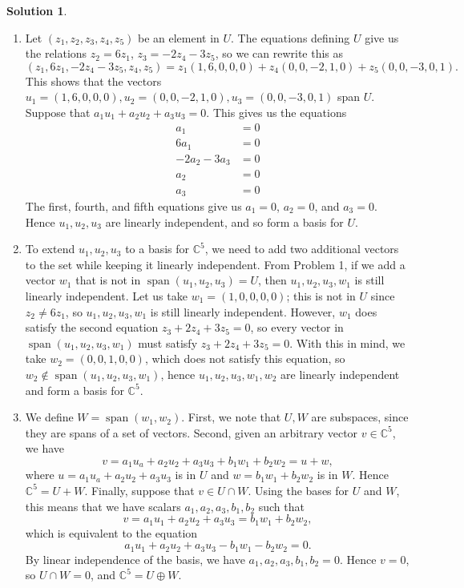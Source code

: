 \documentclass[12pt]{article}
\theoremstyle{definition}
\theoremstyle{definition}
\newtheorem*{soln}{Solution}
\newcommand{\C}{\mathbb{C}}
\newcommand{\Span}{\operatorname{span}}
\begin{document}
\begin{soln}
\begin{enumerate}[label=(\alph*)]
\item Let $(z_1,z_2,z_3,z_4,z_5)$ be an element in $U$. The equations defining $U$ give us the relations $z_2=6z_1$, $z_3=-2z_4-3z_5$, so we can rewrite this as
\[(z_1,6z_1,-2z_4-3z_5,z_4,z_5)=z_1(1,6,0,0,0)+z_4(0,0,-2,1,0)+z_5(0,0,-3,0,1).\]
This shows that the vectors $u_1=(1,6,0,0,0),u_2=(0,0,-2,1,0),u_3=(0,0,-3,0,1)$ span $U$. Suppose that $a_1u_1+a_2u_2+a_3u_3=0$. This gives us the equations
\begin{align*}
a_1 &=0 \\
6a_1 &= 0 \\
-2a_2-3a_3 &= 0 \\ 
a_2 &= 0 \\
a_3 &= 0
\end{align*}
The first, fourth, and fifth equations give us $a_1=0$, $a_2=0$, and $a_3=0$. Hence $u_1,u_2,u_3$ are linearly independent, and so form a basis for $U$.

\item To extend $u_1,u_2,u_3$ to a basis for $\C^5$, we need to add two additional vectors to the set while keeping it linearly independent. From Problem 1, if we add a vector $w_1$ that is not in $\Span(u_1,u_2,u_3)=U$, then $u_1,u_2,u_3,w_1$ is still linearly independent. Let us take $w_1=(1,0,0,0,0)$; this is not in $U$ since $z_2\neq 6z_1$, so $u_1,u_2,u_3,w_1$ is still linearly independent. However, $w_1$ does satisfy the second equation $z_3+2z_4+3z_5=0$, so every vector in $\Span(u_1,u_2,u_3,w_1)$ must satisfy $z_3+2z_4+3z_5=0$. With this in mind, we take $w_2=(0,0,1,0,0)$, which does not satisfy this equation, so $w_2\notin\Span(u_1,u_2,u_3,w_1)$, hence $u_1,u_2,u_3,w_1,w_2$ are linearly independent and form a basis for $\C^5$.

\item We define $W=\Span(w_1,w_2)$. First, we note that $U,W$ are subspaces, since they are spans of a set of vectors. Second, given an arbitrary vector $v\in\C^5$, we have
\[v=a_1u_a+a_2u_2+a_3u_3+b_1w_1+b_2w_2=u+w,\]
where $u=a_1u_a+a_2u_2+a_3u_3$ is in $U$ and $w=b_1w_1+b_2w_2$ is in $W$. Hence $\C^5=U+W$. Finally, suppose that $v\in U\cap W$. Using the bases for $U$ and $W$, this means that we have scalars $a_1,a_2,a_3,b_1,b_2$ such that 
\[v = a_1u_1+a_2u_2+a_3u_3 = b_1w_1+b_2w_2,\]
which is equivalent to the equation
\[a_1u_1+a_2u_2+a_3u_3-b_1w_1-b_2w_2=0.\]
By linear independence of the basis, we have $a_1,a_2,a_3,b_1,b_2=0$. Hence $v=0$, so $U\cap W=0$, and $\C^5=U\oplus W$.
\end{enumerate}
\end{soln}
\end{document}
